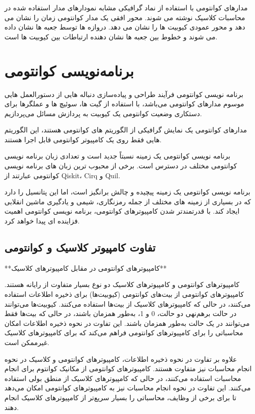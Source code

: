 \documentclass{book}
\begin{document}
مدارهای کوانتومی با استفاده از نماد گرافیکی مشابه نمودارهای مدار استفاده شده در محاسبات کلاسیک نوشته می شوند. محور افقی یک مدار کوانتومی زمان را نشان می دهد و محور عمودی کیوبیت ها را نشان می دهد. دروازه ها توسط جعبه ها نشان داده می شوند و خطوط بین جعبه ها نشان دهنده ارتباطات بین کیوبیت ها است.

\newpage
\chapter{برنامه‌نویسی کوانتومی}
برنامه نویسی کوانتومی فرآیند طراحی و پیاده‌سازی دنباله هایی از دستورالعمل هایی موسوم مدارهای کوانتومی می‌باشد، با استفاده از گیت ها، سوئیچ ها و عملگرها برای دستکاری وضعیت کوانتومی یک کیوبیت به پردازش مسائل می‌پردازیم.

مدارهای کوانتومی یک نمایش گرافیکی از الگوریتم های کوانتومی هستند، این الگوریتم هایی فقط روی یک کامپیوتر کوانتومی قابل اجرا هستند.

برنامه نویسی کوانتومی یک زمینه نسبتاً جدید است و تعدادی زبان برنامه نویسی کوانتومی مختلف در دسترس است. برخی از محبوب ترین زبان های برنامه نویسی کوانتومی عبارتند از Qiskit، Cirq و Quil.

برنامه نویسی کوانتومی یک زمینه پیچیده و چالش برانگیز است، اما این پتانسیل را دارد که در بسیاری از زمینه های مختلف از جمله رمزنگاری، شیمی و یادگیری ماشین انقلابی ایجاد کند. با قدرتمندتر شدن کامپیوترهای کوانتومی، برنامه نویسی کوانتومی اهمیت فزاینده ای پیدا خواهد کرد.
\section{تفاوت کامپیوتر کلاسیک و کوانتومی}

**کامپیوترهای کوانتومی در مقابل کامپیوترهای کلاسیک**

کامپیوترهای کوانتومی و کامپیوترهای کلاسیک دو نوع بسیار متفاوت از رایانه هستند. کامپیوترهای کوانتومی از بیت‌های کوانتومی (کیوبیت‌ها) برای ذخیره اطلاعات استفاده می‌کنند، در حالی که کامپیوترهای کلاسیک از بیت‌ها استفاده می‌کنند. کیوبیت‌ها می‌توانند در حالت برهم‌نهی دو حالت، 0 و 1، به‌طور همزمان باشند، در حالی که بیت‌ها فقط می‌توانند در یک حالت به‌طور همزمان باشند. این تفاوت در نحوه ذخیره اطلاعات امکان محاسباتی را برای کامپیوترهای کوانتومی فراهم می‌کند که برای کامپیوترهای کلاسیک غیرممکن است.

علاوه بر تفاوت در نحوه ذخیره اطلاعات، کامپیوترهای کوانتومی و کلاسیک در نحوه انجام محاسبات نیز متفاوت هستند. کامپیوترهای کوانتومی از مکانیک کوانتوم برای انجام محاسبات استفاده می‌کنند، در حالی که کامپیوترهای کلاسیک از منطق بولی استفاده می‌کنند. این تفاوت در نحوه انجام محاسبات نیز به کامپیوترهای کوانتومی امکان می‌دهد تا برای برخی از وظایف، محاسباتی را بسیار سریع‌تر از کامپیوترهای کلاسیک انجام دهند.
\end{document}

